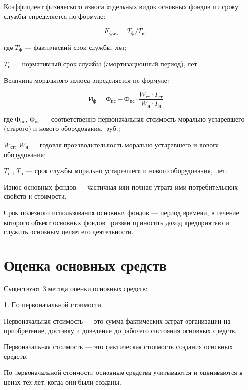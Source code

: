 Коэффициент физического износа отдельных видов основных фондов по сроку службы
определяется по формуле:

\begin{equation}
    K_{\text{ф.н.}} = T_{\text{ф}}/T_{\text{н}},
\end{equation}

где $T_{\text{ф}}$ --- фактический срок службы, лет;

$T_{\text{н}}$ --- нормативный срок службы (амортизационный период), лет.

Величина морального износа определяется по формуле:

\begin{equation}
    \text{И}_{\text{ф}} = \text{Ф}_{\text{пс}} - \text{Ф}_{\text{пс}} \cdot
    \frac{W_{\text{ст}} \cdot T_{\text{ст}}}{W_{\text{н}} \cdot T_{\text{н}}}
\end{equation}

где $\text{Ф}_{\text{пс}}$, $\text{Ф}_{\text{пс}}$ --- соответственно
первоначальная стоимость морально устаревшего (старого) и нового
оборудования,~руб.;

$W_{\text{ст}}$, $W_{\text{н}}$ --- годовая производительность морально
устаревшего и нового оборудования;

$T_{\text{ст}}$, $T_{\text{н}}$ --- срок службы морально устаревшего и нового
оборудования,~лет.

Износ основных фондов --- частичная или полная утрата ими потребительских
свойств и стоимости.

Срок полезного использования основных фондов --- период времени, в течение
которого объект основных фондов призван приносить доход предприятию и служить
основным целям его деятельности.


\section{Оценка основных средств}

Существуют 3 метода оценки основных средств:

1. По первоначальной стоимости

Первоначальная стоимость --- это сумма фактических затрат организации на
приобретение, доставку и доведение до рабочего состояния основных средств.

Первоначальная стоимость --- это фактическая стоимость создания основных средств.

По первоначальной стоимости основные средства учитываются и оцениваются в ценах
тех лет, когда они были созданы.

